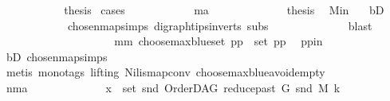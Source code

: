\begin{isabellebody}
\ \ \ \ \ \ \ \ \isamarkupfalse%
\ \isamarkupfalse%
\ {\isacharquery}{\kern0pt}thesis\ \isamarkupfalse%
{\isacharparenleft}{\kern0pt}cases{\isacharparenright}{\kern0pt}\isanewline
\ \ \ \ \ \ \ \ \ \ \isamarkupfalse%
\ ma\isanewline
\ \ \ \ \ \ \ \ \ \ \isamarkupfalse%
\ \isamarkupfalse%
\ {\isacharquery}{\kern0pt}thesis\ \isamarkupfalse%
\ M{\isacharunderscore}{\kern0pt}in\ \ \isamarkupfalse%
\ bD\ \isanewline
\ \ \ \ \ \ \ \ \ \ \ \ chosen{\isacharunderscore}{\kern0pt}map{\isacharunderscore}{\kern0pt}simps{\isacharparenleft}{\kern0pt}{}{\isacharparenright}{\kern0pt}\ digraph{\isachardot}{\kern0pt}tips{\isacharunderscore}{\kern0pt}in{\isacharunderscore}{\kern0pt}verts\ subs\isanewline
\ \ \ \ \ \ \ \ \ \ \ \ \isamarkupfalse%
\ blast\ \isanewline
\ \ \ \ \ \ \ \ \isamarkupfalse%
\isanewline
\ \ \ \ \ \ \ \ \ \ \isamarkupfalse%
\ mm{\isacharcolon}{\kern0pt}\ {\isachardoublequoteopen}choose{\isacharunderscore}{\kern0pt}max{\isacharunderscore}{\kern0pt}blue{\isacharunderscore}{\kern0pt}set\ pp\ {\isasymin}\ set\ pp{\isachardoublequoteclose}\ \isamarkupfalse%
\ pp{\isacharunderscore}{\kern0pt}in\ \isamarkupfalse%
\ bD\ chosen{\isacharunderscore}{\kern0pt}map{\isacharunderscore}{\kern0pt}simps{\isacharparenleft}{\kern0pt}{}{\isacharparenright}{\kern0pt}\isanewline
\ \ \ \ \ \ \ \ \ \ \ \ \isamarkupfalse%
\ {\isacharparenleft}{\kern0pt}metis\ {\isacharparenleft}{\kern0pt}mono{\isacharunderscore}{\kern0pt}tags{\isacharcomma}{\kern0pt}\ lifting{\isacharparenright}{\kern0pt}\ Nil{\isacharunderscore}{\kern0pt}is{\isacharunderscore}{\kern0pt}map{\isacharunderscore}{\kern0pt}conv\ choose{\isacharunderscore}{\kern0pt}max{\isacharunderscore}{\kern0pt}blue{\isacharunderscore}{\kern0pt}avoid{\isacharunderscore}{\kern0pt}empty{\isacharparenright}{\kern0pt}\ \ \ \isanewline
\ \ \ \ \ \ \ \ \ \ \isamarkupfalse%
\ nma\isanewline
\ \ \ \ \ \ \ \ \ \ \isamarkupfalse%
\ \isamarkupfalse%
\ {\isachardoublequoteopen}x\ {\isasymin}\ set\ {\isacharparenleft}{\kern0pt}snd\ {\isacharparenleft}{\kern0pt}OrderDAG\ {\isacharparenleft}{\kern0pt}reduce{\isacharunderscore}{\kern0pt}past\ G\ {\isacharparenleft}{\kern0pt}snd\ M{\isacharparenright}{\kern0pt}{\isacharparenright}{\kern0pt}\ k{\isacharparenright}{\kern0pt}{\isacharparenright}{\kern0pt}{\isachardoublequoteclose}\ \isanewline

\end{isabellebody}
